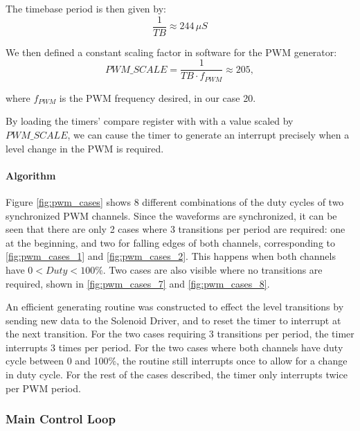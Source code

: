 The timebase period is then given by:
\begin{equation}
\frac{1}{TB}\approx244\,\mu{S}
\end{equation}

We then defined a constant scaling factor in software for the PWM generator:
\begin{equation}
{PWM\_SCALE}=\frac{1}{TB\cdot{f_{PWM}}}\approx205,
\end{equation}

where $f_{PWM}$ is the PWM frequency desired, in our case \unit{20}{\hertz}.

By loading the timers' compare register with with a value scaled by ${PWM\_SCALE}$, we can cause the timer to generate an interrupt precisely when a level change in the PWM is required.

\paragraph{Algorithm}

Figure \ref{fig:pwm_cases} shows 8 different combinations of the duty cycles of two synchronized PWM channels. Since the waveforms are synchronized, it can be seen that there are only 2 cases where 3 transitions per period are required: one at the beginning, and two for falling edges of both channels, corresponding to \ref{fig:pwm_cases_1} and \ref{fig:pwm_cases_2}. This happens when both channels have $0<Duty<100\%$. Two cases are also visible where no transitions are required, shown in \ref{fig:pwm_cases_7} and \ref{fig:pwm_cases_8}.

An efficient generating routine was constructed to effect the level transitions by sending new data to the Solenoid Driver, and to reset the timer to interrupt at the next transition. For the two cases requiring 3 transitions per period, the timer interrupts 3 times per period. For the two cases where both channels have duty cycle between 0 and 100\%, the routine still interrupts once to allow for a change in duty cycle. For the rest of the cases described, the timer only interrupts twice per PWM period.



\subsubsection{Main Control Loop}